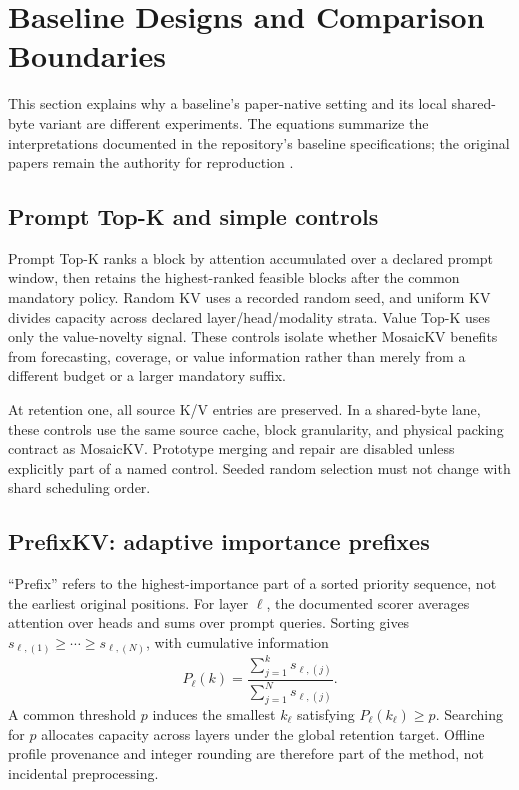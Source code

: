 \section{Baseline Designs and Comparison Boundaries}
\label{app:baselines}
This section explains why a baseline's paper-native setting and its local
shared-byte variant are different experiments. The equations summarize the
interpretations documented in the repository's baseline specifications; the
original papers remain the authority for reproduction
\citep{wang2025prefixkv,tu2025vlcache,wan2024lookm}.

\subsection{Prompt Top-K and simple controls}
Prompt Top-K ranks a block by attention accumulated over a declared prompt
window, then retains the highest-ranked feasible blocks after the common
mandatory policy. Random KV uses a recorded random seed, and uniform KV divides
capacity across declared layer/head/modality strata. Value Top-K uses only the
value-novelty signal. These controls isolate whether MosaicKV benefits from
forecasting, coverage, or value information rather than merely from a different
budget or a larger mandatory suffix.

At retention one, all source K/V entries are preserved. In a shared-byte lane,
these controls use the same source cache, block granularity, and physical
packing contract as MosaicKV. Prototype merging and repair are disabled unless
explicitly part of a named control. Seeded random selection must not change
with shard scheduling order.

\subsection{PrefixKV: adaptive importance prefixes}
``Prefix'' refers to the highest-importance part of a sorted priority sequence,
not the earliest original positions. For layer $\ell$, the documented scorer
averages attention over heads and sums over prompt queries. Sorting gives
$s_{\ell,(1)}\ge\cdots\ge s_{\ell,(N)}$, with cumulative information
\begin{equation}
 P_\ell(k)=\frac{\sum_{j=1}^{k}s_{\ell,(j)}}{\sum_{j=1}^{N}s_{\ell,(j)}}.
\end{equation}
A common threshold $p$ induces the smallest $k_\ell$ satisfying
$P_\ell(k_\ell)\ge p$. Searching for $p$ allocates capacity across layers under
the global retention target. Offline profile provenance and integer rounding
are therefore part of the method, not incidental preprocessing.

